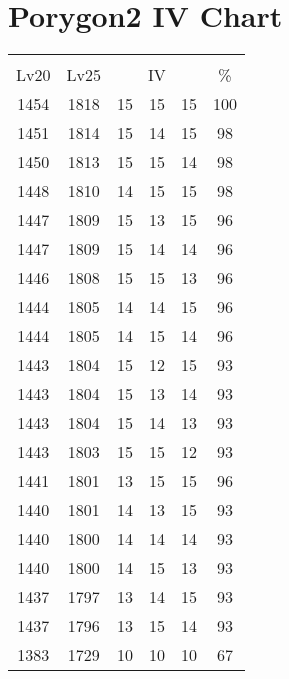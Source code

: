 \documentclass{article}%
\begin{document}
%
\normalsize%
\section{Porygon2 IV Chart}%
\label{sec:Porygon2 IV Chart}%
\renewcommand{\arraystretch}{1.5}%
\begin{tabular}{|c|c|c|c|c|c|}%
\hline%
\multicolumn{6}{|c|}{\textcolor{white}{ 
\linebreak{Porygon2}
}%
\cellcolor{black}}\\%
\multicolumn{1}{|c}{Lv20}&\multicolumn{1}{c|}{Lv25}&\multicolumn{3}{c|}{IV}&\multicolumn{1}{|c|}{\%}\\%
\hline%
\rowcolor{color100}%
1454&1818&15&15&15&100\\%
\hline%
\rowcolor{color98}%
1451&1814&15&14&15&98\\%
\hline%
\rowcolor{color98}%
1450&1813&15&15&14&98\\%
\hline%
\rowcolor{color98}%
1448&1810&14&15&15&98\\%
\hline%
\rowcolor{color96}%
1447&1809&15&13&15&96\\%
\hline%
\rowcolor{color96}%
1447&1809&15&14&14&96\\%
\hline%
\rowcolor{color96}%
1446&1808&15&15&13&96\\%
\hline%
\rowcolor{color96}%
1444&1805&14&14&15&96\\%
\hline%
\rowcolor{color96}%
1444&1805&14&15&14&96\\%
\hline%
\rowcolor{color93}%
1443&1804&15&12&15&93\\%
\hline%
\rowcolor{color93}%
1443&1804&15&13&14&93\\%
\hline%
\rowcolor{color93}%
1443&1804&15&14&13&93\\%
\hline%
\rowcolor{color93}%
1443&1803&15&15&12&93\\%
\hline%
\rowcolor{color96}%
1441&1801&13&15&15&96\\%
\hline%
\rowcolor{color93}%
1440&1801&14&13&15&93\\%
\hline%
\rowcolor{color93}%
1440&1800&14&14&14&93\\%
\hline%
\rowcolor{color93}%
1440&1800&14&15&13&93\\%
\hline%
\rowcolor{color93}%
1437&1797&13&14&15&93\\%
\hline%
\rowcolor{color93}%
1437&1796&13&15&14&93\\%
\hline%
\rowcolor{color91}%
1383&1729&10&10&10&67\\%
\end{tabular}

%
\end{document}
